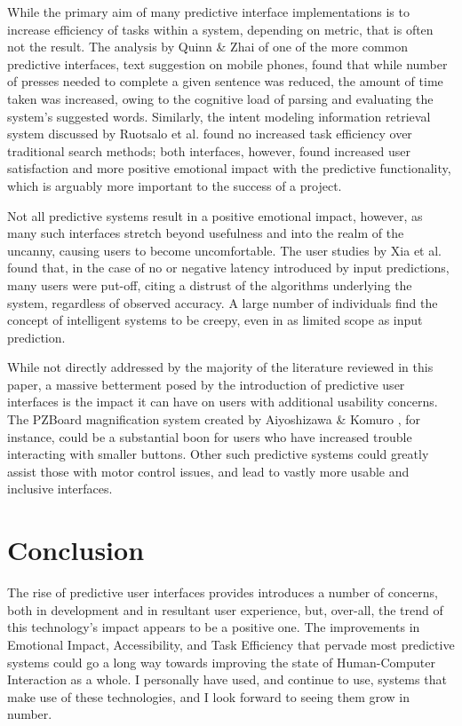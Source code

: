 \documentclass[format=acmsmall, nonacm, authorversion, screen]{acmart}
\begin{document}
While the primary aim of many predictive interface implementations is to increase efficiency of tasks within a system, depending on metric, that is often not the result. The analysis by Quinn \& Zhai \citep{quinn2016costbenefit} of one of the more common predictive interfaces, text suggestion on mobile phones, found that while number of presses needed to complete a given sentence was reduced, the amount of time taken was increased, owing to the cognitive load of parsing and evaluating the system's suggested words. Similarly, the intent modeling information retrieval system discussed by Ruotsalo et al. \citep{ruotsalo2014intent} found no increased task efficiency over traditional search methods; both interfaces, however, found increased user satisfaction and more positive emotional impact with the predictive functionality, which is arguably more important to the success of a project.

Not all predictive systems result in a positive emotional impact, however, as many such interfaces stretch beyond usefulness and into the realm of the uncanny, causing users to become uncomfortable. The user studies by Xia et al. \citep{xia2014zerolatency} found that, in the case of no or negative latency introduced by input predictions, many users were put-off, citing a distrust of the algorithms underlying the system, regardless of observed accuracy. A large number of individuals find the concept of intelligent systems to be creepy, even in as limited scope as input prediction. 

While not directly addressed by the majority of the literature reviewed in this paper, a massive betterment posed by the introduction of predictive user interfaces is the impact it can have on users with additional usability concerns. The PZBoard magnification system created by Aiyoshizawa \& Komuro \citep{aiyoshizawa2016pzboard}, for instance, could be a substantial boon for users who have increased trouble interacting with smaller buttons. Other such predictive systems could greatly assist those with motor control issues, and lead to vastly more usable and inclusive interfaces. 

\section{Conclusion}%
The rise of predictive user interfaces provides introduces a number of concerns, both in development and in resultant user experience, but, over-all, the trend of this technology's impact appears to be a positive one. The improvements in Emotional Impact, Accessibility, and Task Efficiency that pervade most predictive systems could go a long way towards improving the state of Human-Computer Interaction as a whole. I personally have used, and continue to use, systems that make use of these technologies, and I look forward to seeing them grow in number. 




\end{document}
